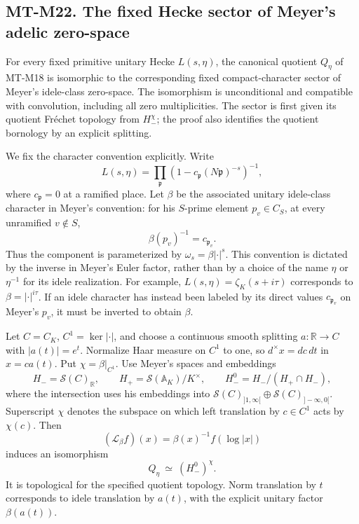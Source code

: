 \subsection*{MT-M22. The fixed Hecke sector of Meyer's adelic zero-space}

For every fixed primitive unitary Hecke \(L(s,\eta)\), the
canonical quotient \(Q_\eta\) of MT-M18 is isomorphic to the
corresponding fixed compact-character sector of Meyer's
idele-class zero-space.  The isomorphism is unconditional
and compatible with convolution, including all zero
multiplicities.  The sector is first given its quotient
Fr\'echet topology from \(H_-^\chi\); the proof also
identifies the quotient bornology by an explicit splitting.

We fix the character convention explicitly.  Write
\[
 L(s,\eta)=\prod_{\mathfrak p}
       (1-c_{\mathfrak p}(N\mathfrak p)^{-s})^{-1},
\]
where \(c_{\mathfrak p}=0\) at a ramified place.  Let
\(\beta\) be the associated unitary idele-class character
in Meyer's convention: for his \(S\)-prime element
\(p_v\in C_S\), at every unramified \(v\notin S\),
\[
                      \beta(p_v)^{-1}=c_{\mathfrak p_v}.
                                                               \tag{M22.1}
\]
Thus the component is parameterized by
\(\omega_s=\beta|\cdot|^s\).
This convention is dictated by the inverse in Meyer's
Euler factor, rather than by a choice of the name
\(\eta\) or \(\eta^{-1}\) for its idele realization.
For example, \(L(s,\eta)=\zeta_K(s+i\tau)\) corresponds
to \(\beta=|\cdot|^{i\tau}\).
If an idele character has instead been labeled by
its direct values \(c_{\mathfrak p_v}\) on Meyer's
\(p_v\), it must be inverted to obtain \(\beta\).

Let \(C=C_K\), \(C^1=\ker|\cdot|\), and choose a
continuous smooth splitting \(a:\mathbb R\to C\)
with \(|a(t)|=e^t\).
Normalize Haar measure on \(C^1\) to one, so
\(d^\times x=dc\,dt\) in \(x=ca(t)\).
Put \(\chi=\beta|_{C^1}\).
Use Meyer's spaces and embeddings
\[
 H_-=\mathcal S(C)_{\mathbb R},\qquad
 H_+=\mathcal S(\mathbb A_K)/K^\times,\qquad
 H_-^0=H_-/(H_+\cap H_-),
\]
where the intersection uses his embeddings into
\(\mathcal S(C)_{]1,\infty[}\oplus
  \mathcal S(C)_{]-\infty,0[}\).
Superscript \(\chi\) denotes the subspace on which
left translation by \(c\in C^1\) acts by \(\chi(c)\).
Then
\[
 (\mathcal L_\beta f)(x)=\beta(x)^{-1}f(\log|x|)
\]
induces an isomorphism
\[
              Q_\eta \ \simeq\ (H_-^0)^\chi.                  \tag{M22.2}
\]
It is topological for the specified quotient topology.
Norm translation by \(t\) corresponds to idele
translation by \(a(t)\), with the explicit unitary
factor \(\beta(a(t))\).

